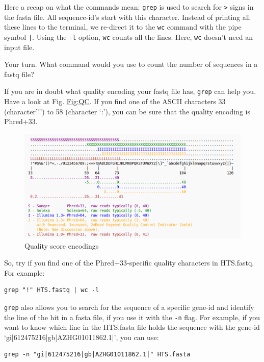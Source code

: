 \documentclass[11pt]{article}
\begin{document}
Here a recap on what the commands mean: \texttt{grep} is used to search for
\texttt{>} signs in the fasta file. All sequence-id's start with this
character. Instead of printing all these lines to the terminal, we
re-direct it to the \texttt{wc} command with the pipe symbol \texttt{|}. Using the
\texttt{-l} option, \texttt{wc} counts all the lines. Here, \texttt{wc} doesn't need an
input file.


Your turn. What command would you use to count the number of sequences
in a fastq file? 


If you are in doubt what quality encoding your fastq file has, \texttt{grep}
can help you. Have a look at Fig. \hyperref[Fig-QC]{Fig:QC}. If you find one of the ASCII
characters 33 (character'!') to 58 (character `:'), you can be sure
that the quality encoding is Phred+33. 


\begin{figure}[htb]
\centering
\includegraphics[width=14cm]{Fastq.png}
\caption{Quality score encodings}
\end{figure}


So, try if you find one of the Phred+33-specific quality characters in
HTS.fastq. For example:


\begin{verbatim}
grep "!" HTS.fastq | wc -l
\end{verbatim}



\texttt{grep} also allows you to search for the sequence of a specific
gene-id and identify the line of the hit in a fasta file, if you use
it with the \texttt{-n} flag. For example, if you want to know which line
in the HTS.fasta file holds the sequence with the gene-id
`gi|612475216|gb|AZHG01011862.1|', you can use:


\begin{verbatim}
grep -n "gi|612475216|gb|AZHG01011862.1|" HTS.fasta
\end{verbatim}
\end{document}

